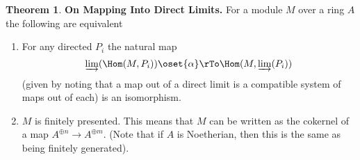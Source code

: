 \documentclass[12 pt]{article}
\theoremstyle{definition}
\newtheorem{thm}{Theorem}[section]
\renewcommand{\(}{\left(}
\renewcommand{\)}{\right)}
\begin{document}
\begin{thm} \textbf{On Mapping Into Direct Limits.} For a module $M$ over a ring $A$ the following are equivalent
\begin{enumerate}
\item  For any directed $P_i$ the natural map
\[\varinjlim(\Hom(M,P_i)) \oset{\alpha}\rTo \Hom(M, \varinjlim(P_i))\]
(given by noting that a map out of a direct limit is a compatible system of maps out of each) is an isomorphism.

\item $M$ is finitely presented. This means that $M$ can be written as the cokernel of a map $A^{\oplus n} \to A^{\oplus m}$. (Note that if $A$ is Noetherian, then this is the same as being finitely generated).

\end{enumerate}
\end{thm}
\end{document}
